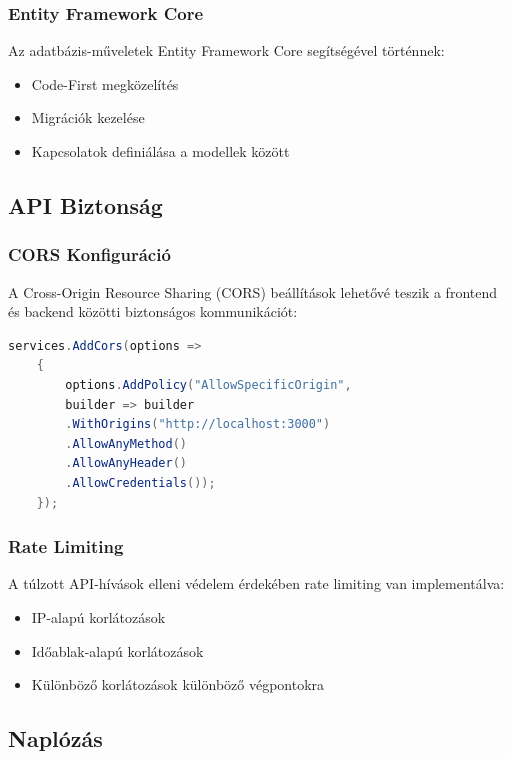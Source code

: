 \documentclass[colorlinks]{thesis-kando}
\theoremstyle{definition}
\theoremstyle{remark}
\begin{document}
 \subsubsection{Entity Framework Core}
 
 Az adatbázis-műveletek Entity Framework Core segítségével történnek:
 
 \begin{itemize}
 	\item Code-First megközelítés
 	\item Migrációk kezelése
 	\item Kapcsolatok definiálása a modellek között
 \end{itemize}
 
 \subsection{API Biztonság}
 
 \subsubsection{CORS Konfiguráció}
 
 A Cross-Origin Resource Sharing (CORS) beállítások lehetővé teszik a frontend és backend közötti biztonságos kommunikációt:
 
 \begin{lstlisting}[language=csharp]
 	services.AddCors(options =>
 	{
 		options.AddPolicy("AllowSpecificOrigin",
 		builder => builder
 		.WithOrigins("http://localhost:3000")
 		.AllowAnyMethod()
 		.AllowAnyHeader()
 		.AllowCredentials());
 	});
 \end{lstlisting}
 
 \subsubsection{Rate Limiting}
 
 A túlzott API-hívások elleni védelem érdekében rate limiting van implementálva:
 
 \begin{itemize}
 	\item IP-alapú korlátozások
 	\item Időablak-alapú korlátozások
 	\item Különböző korlátozások különböző végpontokra
 \end{itemize}
 
 \subsection{Naplózás}
 
\end{document}
